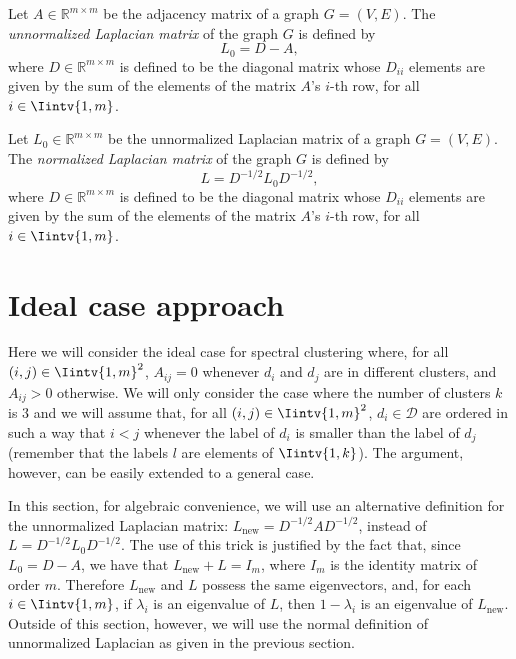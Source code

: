 \begin{definition}
   Let $A \in \mathbb R ^{m \times m}$ be the adjacency matrix of a graph $G = (V, E)$. The \textit{unnormalized Laplacian matrix} of the graph $G$ is defined by
   \begin{equation}
      L_0 = D - A,
   \end{equation}
   where $D \in \mathbb R ^{m \times m}$ is defined to be the diagonal matrix whose $D_{ii}$ elements are given by the sum of the elements of the matrix $A$'s $i$-th row, for all $i \in \Iintv{1,m}$.
\end{definition}

\begin{definition}\label{unnormalized}
   Let $L_0 \in \mathbb R ^{m \times m}$ be the unnormalized Laplacian matrix of a graph $G = (V, E)$. The \textit{normalized Laplacian matrix} of the graph $G$ is defined by
   \begin{equation}
      L = D^{-1/2}L_0D^{-1/2},
   \end{equation}
   where $D \in \mathbb R ^{m \times m}$ is defined to be the diagonal matrix whose $D_{ii}$ elements are given by the sum of the elements of the matrix $A$'s $i$-th row, for all $i \in \Iintv{1,m}$. 
\end{definition}

\section{Ideal case approach}
Here we will consider the ideal case for spectral clustering where, for all $(i,j) \in \Iintv{1,m}^2$, $A_{ij} = 0$ whenever $d_i$ and $d_j$ are in different clusters, and $A_{ij} > 0$ otherwise.
We will only consider the case where the number of clusters $k$ is $3$ and we will assume that, for all $(i,j) \in \Iintv{1,m}^2$, $d_i \in \mathcal D$ are ordered in such a way that $i < j$ whenever the label of $d_i$ is smaller than the label of $d_j$ (remember that the labels $l$ are elements of $\Iintv{1,k}$).
The argument, however, can be easily extended to a general case.

In this section, for algebraic convenience, we will use an alternative definition for the unnormalized Laplacian matrix: $L_{\text{new}} = D^{-1/2}AD^{-1/2}$, instead of $L = D^{-1/2}L_0D^{-1/2}$.
The use of this trick is justified by the fact that, since $L_0 = D - A$, we have that $L_{\text{new}} + L = I_m$, where $I_m$ is the identity matrix of order $m$.
Therefore $L_{\text{new}}$ and $L$ possess the same eigenvectors, and, for each $i \in \Iintv{1,m}$, if $\lambda _i$ is an eigenvalue of $L$, then $1 - \lambda _i$ is an eigenvalue of $L_{\text{new}}$. 
Outside of this section, however, we will use the normal definition of unnormalized Laplacian as given in the previous section.

